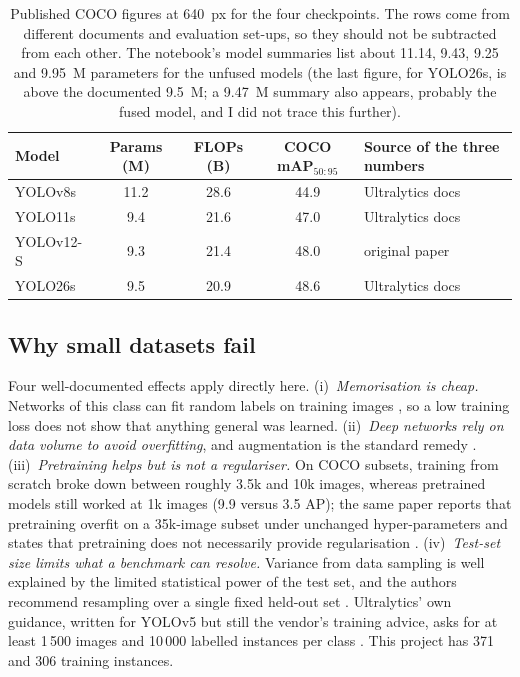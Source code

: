 \documentclass[11pt,a4paper]{article}
\begin{document}
\begin{table}[H]
\centering\small
\begin{tabular}{lcccl}
\toprule
Model & Params (M) & FLOPs (B) & COCO mAP$_{50:95}$ & Source of the three numbers\\
\midrule
YOLOv8s  & 11.2 & 28.6 & 44.9 & Ultralytics docs \cite{ultralytics_yolo11_vs_v8}\\
YOLO11s  & 9.4  & 21.6 & 47.0 & Ultralytics docs \cite{ultralytics_yolo11_vs_v8}\\
YOLOv12-S & 9.3 & 21.4 & 48.0 & original paper \cite{tian2025yolov12}\\
YOLO26s  & 9.5  & 20.9 & 48.6 & Ultralytics docs \cite{ultralytics_yolo26_vs_11}\\
\bottomrule
\end{tabular}
\caption{Published COCO figures at 640~px for the four checkpoints. The rows come from different documents and evaluation set-ups, so they should not be subtracted from each other. The notebook's model summaries list about 11.14, 9.43, 9.25 and 9.95~M parameters for the unfused models (the last figure, for YOLO26s, is above the documented 9.5~M; a 9.47~M summary also appears, probably the fused model, and I did not trace this further).}
\label{tab:models}
\end{table}

\subsection{Why small datasets fail}
Four well-documented effects apply directly here. (i)~\emph{Memorisation is cheap.} Networks of this class can fit random labels on training images \cite{zhang2017rethinking}, so a low training loss does not show that anything general was learned. (ii)~\emph{Deep networks rely on data volume to avoid overfitting}, and augmentation is the standard remedy \cite{shorten2019survey}. (iii)~\emph{Pretraining helps but is not a regulariser.} On COCO subsets, training from scratch broke down between roughly 3.5k and 10k images, whereas pretrained models still worked at 1k images (9.9 versus 3.5 AP); the same paper reports that pretraining overfit on a 35k-image subset under unchanged hyper-parameters and states that pretraining does not necessarily provide regularisation \cite{he2019rethinking}. (iv)~\emph{Test-set size limits what a benchmark can resolve.} Variance from data sampling is well explained by the limited statistical power of the test set, and the authors recommend resampling over a single fixed held-out set \cite{bouthillier2021variance}. Ultralytics' own guidance, written for YOLOv5 but still the vendor's training advice, asks for at least 1\,500 images and 10\,000 labelled instances per class \cite{ultralytics_tips}. This project has 371 and 306 training instances.
\end{document}

